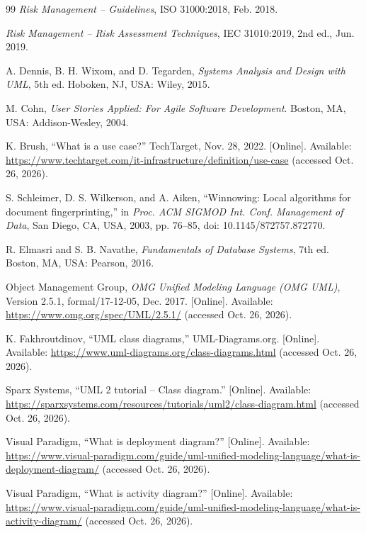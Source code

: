 \begin{thebibliography}{99}
 \textit{Risk Management -- Guidelines}, ISO 31000:2018, Feb. 2018.

 \textit{Risk Management -- Risk Assessment Techniques}, IEC 31010:2019, 2nd ed., Jun. 2019.

 A. Dennis, B. H. Wixom, and D. Tegarden, \textit{Systems Analysis and Design with UML}, 5th ed. Hoboken, NJ, USA: Wiley, 2015.

 M. Cohn, \textit{User Stories Applied: For Agile Software Development}. Boston, MA, USA: Addison-Wesley, 2004.

 K. Brush, ``What is a use case?'' TechTarget, Nov. 28, 2022. [Online]. Available: \url{https://www.techtarget.com/it-infrastructure/definition/use-case} (accessed Oct. 26, 2026).

 S. Schleimer, D. S. Wilkerson, and A. Aiken, ``Winnowing: Local algorithms for document fingerprinting,'' in \textit{Proc. ACM SIGMOD Int. Conf. Management of Data}, San Diego, CA, USA, 2003, pp. 76--85, doi: 10.1145/872757.872770.

 R. Elmasri and S. B. Navathe, \textit{Fundamentals of Database Systems}, 7th ed. Boston, MA, USA: Pearson, 2016.

 Object Management Group, \textit{OMG Unified Modeling Language (OMG UML)}, Version 2.5.1, formal/17-12-05, Dec. 2017. [Online]. Available: \url{https://www.omg.org/spec/UML/2.5.1/} (accessed Oct. 26, 2026).

 K. Fakhroutdinov, ``UML class diagrams,'' UML-Diagrams.org. [Online]. Available: \url{https://www.uml-diagrams.org/class-diagrams.html} (accessed Oct. 26, 2026).

 Sparx Systems, ``UML 2 tutorial -- Class diagram.'' [Online]. Available: \url{https://sparxsystems.com/resources/tutorials/uml2/class-diagram.html} (accessed Oct. 26, 2026).

 Visual Paradigm, ``What is deployment diagram?'' [Online]. Available: \url{https://www.visual-paradigm.com/guide/uml-unified-modeling-language/what-is-deployment-diagram/} (accessed Oct. 26, 2026).

 Visual Paradigm, ``What is activity diagram?'' [Online]. Available: \url{https://www.visual-paradigm.com/guide/uml-unified-modeling-language/what-is-activity-diagram/} (accessed Oct. 26, 2026).


\end{thebibliography}
